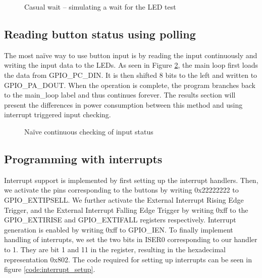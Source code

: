 \begin{figure}[h!]
\caption{Casual wait – simulating a wait for the LED test}
\label{code:casual_wait}
\end{figure}

\subsection{Reading button status using polling}
\label{subsec:polling}

The most naïve way to use button input is by reading the input continuously and writing the input data to the LEDs.
As seen in Figure \ref{code:polling}, the main loop first loads the data from GPIO\_PC\_DIN.
It is then shifted 8 bits to the left and written to GPIO\_PA\_DOUT.
When the operation is complete, the program branches back to the main\_loop label and thus continues forever.
The results section will present the differences in power consumption between this method and using interrupt triggered input checking.

\begin{figure}[h!]
\caption{Naïve continuous checking of input status}
\label{code:polling}
\end{figure}

\subsection{Programming with interrupts}
\label{subsec:dev_pros_interrupts}

Interrupt support is implemented by first setting up the interrupt handlers.
Then, we activate the pins corresponding to the buttons by writing 0x22222222 to GPIO\_EXTIPSELL.
We further activate the External Interrupt Rising Edge Trigger, and the External Interrupt Falling Edge Trigger by writing 0xff to the GPIO\_EXTIRISE and GPIO\_EXTIFALL registers respectively.
Interrupt generation is enabled by writing 0xff to GPIO\_IEN.
To finally implement handling of interrupts, we set the two bits in ISER0 corresponding to our handler to 1. They are bit 1 and 11 in the register, resulting in the hexadecimal representation 0x802.
The code required for setting up interrupts can be seen in figure \ref{code:interrupt_setup}.

